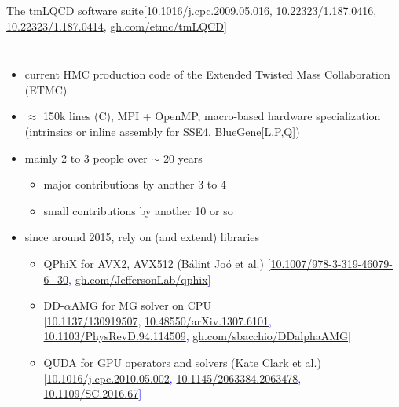 \documentclass[xcolor={dvipsnames,table}]{beamer}
\begin{document}
\begin{frame}{The tmLQCD software suite}{[\href{https://doi.org/10.1016/j.cpc.2009.05.016}{10.1016/j.cpc.2009.05.016}, \href{https://doi.org/10.22323/1.187.0416}{10.22323/1.187.0416}, \href{https://doi.org/10.22323/1.187.0414}{10.22323/1.187.0414}, \href{https://www.github.com/etmc/tmLQCD}{gh.com/etmc/tmLQCD}]}
  \begin{columns}
      \begin{itemize}
        \item current HMC production code of the Extended Twisted Mass Collaboration (ETMC)
        \vspace{0.2cm}
        \item $\approx$ 150k lines (C), MPI + OpenMP, macro-based hardware specialization (intrinsics or inline assembly for SSE4, BlueGene[L,P,Q])
        \vspace{0.2cm}
        \item mainly 2 to 3 people over $\sim$ 20 years
        \begin{itemize}
          \item major contributions by another 3 to 4
          \vspace{0.1cm}
          \item small contributions by another 10 or so
        \end{itemize}
        \vspace{0.2cm}
        \item since around 2015, rely on (and extend) libraries
        \begin{itemize}
          \item QPhiX for AVX2, AVX512 (B{\'a}lint Jo{\'o} et al.) \hfill \footnotesize{\textcolor{blue}{[\href{https://doi.org/10.1007/978-3-319-46079-6_30}{10.1007/978-3-319-46079-6\_30}, \href{https://github.com/JeffersonLab/qphix}{gh.com/JeffersonLab/qphix}]}}
          \vspace{0.2cm}
        \item DD-$\alpha$AMG for MG solver on CPU \\ \footnotesize{\textcolor{blue}{[\href{https://doi.org/10.1137/130919507}{10.1137/130919507}, \href{https://doi.org/10.48550/arXiv.1307.6101}{10.48550/arXiv.1307.6101}, \href{https://doi.org/10.1103/PhysRevD.94.114509}{10.1103/PhysRevD.94.114509}, \href{https://github.com/sbacchio/DDalphaAMG}{gh.com/sbacchio/DDalphaAMG}]}}
          \vspace{0.2cm}
        \item QUDA for GPU operators and solvers (Kate Clark et al.) \footnotesize{\textcolor{blue}{[\href{https://doi.org/10.1016/j.cpc.2010.05.002}{10.1016/j.cpc.2010.05.002}, \href{https://doi.org/10.1145/2063384.2063478}{10.1145/2063384.2063478}, \href{http://dx.doi.org/10.1109/SC.2016.67}{10.1109/SC.2016.67}] } }

\end{itemize}
\end{itemize}
\end{columns}
\end{frame}
\end{document}
